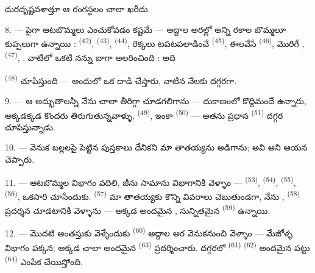 దురదృష్టవశాత్తూ ఆ రంగస్థలం చాలా ఖరీదు.

8. --- పైగా ఆటబొమ్మలు ఎంచుకోవడం కష్టమే — అద్దాల అరల్లో అన్ని రకాల బొమ్మలూ కుప్పలుగా
ఉన్నాయి :  \textsuperscript{(42)}, 
\textsuperscript{(43)},  \textsuperscript{(44)}, రెక్కలు టపటపలాడించే
 \textsuperscript{(45)}, ఈలవేసే 
\textsuperscript{(46)}, మొరిగే , 
\textsuperscript{(47)}, . వాటిలో ఒకటి నన్ను బాగా అలరించింది : అది

 \textsuperscript{(48)} చూపిస్తుంది — అందులో ఒక 
 దాడి చేస్తారు,  నాటిన నేలకు దగ్గరగా.


9. --- ఆ అద్భుతాలన్నీ నేను చాలా తీరిగ్గా చూడగలిగాను — దుకాణంలో కొద్దిమందే ఉన్నారు,
అక్కడక్కడ కొందరు తిరుగుతున్నవాళ్ళు,  \textsuperscript{(49)},
ఇంకా  \textsuperscript{(50)} — అతను ప్రధాన 
\textsuperscript{(51)} దగ్గర  చూపిస్తున్నాడు.

10. ---  వెనుక బల్లలపై పెట్టిన పుస్తకాలు దేనికని మా తాతయ్యను అడిగాను;
అవి  అని ఆయన చెప్పారు.

\VUsaut{3.6mm}
\VUsaut{2.8mm}

11. --- ఆటబొమ్మల విభాగం వదిలి, జీను సామాను విభాగానికి వెళ్ళాం — 
\textsuperscript{(53)},  \textsuperscript{(54)}, 
\textsuperscript{(55)},  \textsuperscript{(56)},
 ఒకసారి చూసేందుకు.  \textsuperscript{(57)} మా
తాతయ్యకు కొన్ని వివరాలు చెబుతుండగా, నేను ,
 \textsuperscript{(58)} ప్రదర్శన చూడటానికి వెళ్ళాను — అక్కడ
అందమైన , సున్నితమైన  \textsuperscript{(59)}
ఉన్నాయి.

12. --- మొదటి అంతస్తుకు వెళ్ళేందుకు  \textsuperscript{(60)} అద్దాల అర
వెనుకనుంచి వెళ్ళాం — మేజోళ్ళ విభాగం పక్కన; అక్కడ చాలా అందమైన 
\textsuperscript{(63)} ప్రదర్శించారు. దగ్గరలో  \textsuperscript{(61)}
 \textsuperscript{(62)} అందమైన పట్టు 
\textsuperscript{(64)} ఎంపిక చేయిస్తోంది.

